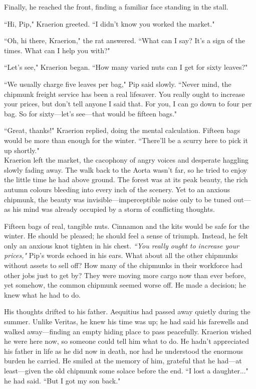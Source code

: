 Finally, he reached the front, finding a familiar face standing in the stall.

``Hi, Pip," Kraerion greeted.
``I didn't know you worked the market."

``Oh, hi there, Kraerion," the rat answered.
``What can I say? It's a sign of the times.
What can I help you with?"

``Let's see," Kraerion began.
``How many varied nuts can I get for sixty leaves?"

``We usually charge five leaves per bag," Pip said slowly.
``Never mind, the chipmunk freight service has been a real lifesaver.
You really ought to increase your prices, but don't tell anyone I said that.
For you, I can go down to four per bag.
So for sixty---let's see---that would be fifteen bags."

``Great, thanks!" Kraerion replied, doing the mental calculation.
Fifteen bags would be more than enough for the winter.
``There'll be a scurry here to pick it up shortly."\\

Kraerion left the market, the cacophony of angry voices and desperate haggling slowly fading away.
The walk back to the Aorta wasn't far, so he tried to enjoy the little time he had above ground.
The forest was at its peak beauty, the rich autumn colours bleeding into every inch of the scenery.
Yet to an anxious chipmunk, the beauty was invisible---imperceptible noise only to be tuned out---as his mind was already occupied by a storm of conflicting thoughts.

Fifteen bags of real, tangible nuts.
Cinnamon and the kits would be safe for the winter.
He should be pleased; he should feel a sense of triumph.
Instead, he felt only an anxious knot tighten in his chest.
\textit{``You really ought to increase your prices,"} Pip's words echoed in his ears.
What about all the other chipmunks without assets to sell off?
How many of the chipmunks in their workforce had other jobs just to get by?
They were moving more cargo now than ever before, yet somehow, the common chipmunk seemed worse off.
He made a decision; he knew what he had to do.

His thoughts drifted to his father.
Aequitius had passed away quietly during the summer.
Unlike Veritas, he knew his time was up; he had said his farewells and walked away---finding an empty hiding place to pass peacefully.
Kraerion wished he were here now, so someone could tell him what to do.
He hadn't appreciated his father in life as he did now in death, nor had he understood the enormous burden he carried.
He smiled at the memory of him, grateful that he had---at least---given the old chipmunk some solace before the end.
``I lost a daughter..." he had said.
``But I got my son back."

